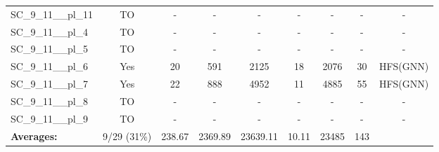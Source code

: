 \documentclass{article}
\begin{document}
\begin{tabular}{lcccccccc}
SC\_9\_11\_\_pl\_11 & TO & - & - & - & - & - & - & - \\
SC\_9\_11\_\_pl\_4 & TO & - & - & - & - & - & - & - \\
SC\_9\_11\_\_pl\_5 & TO & - & - & - & - & - & - & - \\
SC\_9\_11\_\_pl\_6 & Yes & 20 & 591 & 2125 & 18 & 2076 & 30 & HFS(GNN) \\
SC\_9\_11\_\_pl\_7 & Yes & 22 & 888 & 4952 & 11 & 4885 & 55 & HFS(GNN) \\
SC\_9\_11\_\_pl\_8 & TO & - & - & - & - & - & - & - \\
SC\_9\_11\_\_pl\_9 & TO & - & - & - & - & - & - & - \\
\textbf{Averages:} & 9/29 (31\%) & 238.67 & 2369.89 & 23639.11 & 10.11 & 23485 & 143 & \\
\bottomrule
\end{tabular}
\\[0.7cm]
\end{document}
